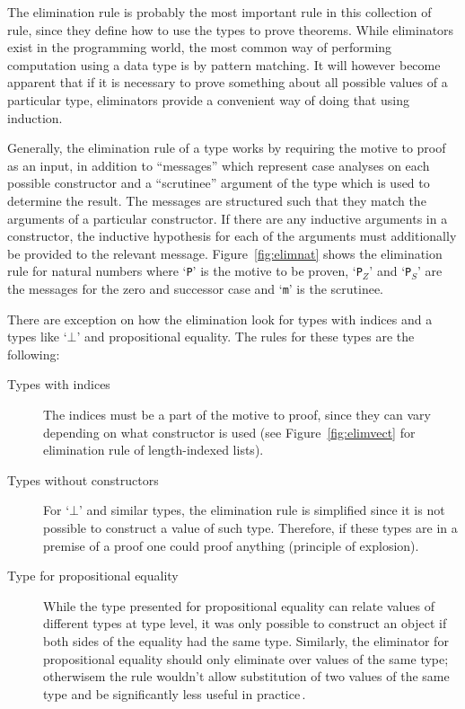 \documentclass[a4paper]{article}%
\begin{document}
The elimination rule is probably the most important rule in this collection of rule, since they define how to use the types to prove theorems. While eliminators exist in the programming world, the most common way of performing computation using a
data type is by pattern matching. It will however become apparent that if it is necessary to prove something about all possible values of a particular type, eliminators provide a convenient way of doing that using induction.

Generally, the elimination rule of a type works by requiring the motive to proof as an input, in addition to ``messages'' which represent case analyses on each possible constructor and a ``scrutinee'' argument of the type which is used
to determine the result. The messages are structured such that they match the arguments of a particular constructor. If there are any inductive arguments in a constructor,
the inductive hypothesis for each of the arguments must additionally be provided to the relevant message.
Figure~\ref{fig:elimnat} shows the elimination rule for natural numbers where `\texttt{P}' is the motive to be proven, `\texttt{P$_Z$}' and `\texttt{P$_S$}' are the messages for the zero and successor case and `\texttt{m}' is the scrutinee.

There are exception on how the elimination look for types with indices and a types like `\texttt{$\bot$}' and propositional equality. The rules for these types are the following:
\begin{description}
  \item[Types with indices] The indices must be a part of the motive to proof, since they can vary depending on what constructor is used (see Figure~\ref{fig:elimvect} for elimination rule of length-indexed lists).
  \item[Types without constructors] For `\texttt{$\bot$}' and similar types, the elimination rule is simplified since it is not possible to construct a value of such type. Therefore, if these types are in a premise of a proof one could proof anything (principle of explosion).
  \item[Type for propositional equality] While the type presented for propositional equality can relate values of different types at type level, it was only possible to construct an object if both sides of the equality had the same type. Similarly, the eliminator
    for propositional equality should only eliminate over values of the same type; otherwisem the rule wouldn't allow substitution of two values of the same type and be significantly less useful in practice\,\cite{mcbride1999thesis}.
\end{description}
\end{document}
